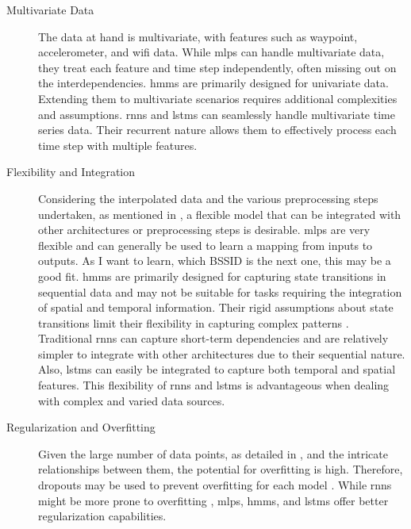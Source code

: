 \begin{description}
\item [Multivariate Data]
The data at hand is multivariate, with features such as waypoint, accelerometer, and \ac{wifi} data.
While \acp{mlp} can handle multivariate data, they treat each feature and time step independently, often missing out on the interdependencies.
\acp{hmm} are primarily designed for univariate data. Extending them to multivariate scenarios requires additional complexities and assumptions.
\acp{rnn} and \acp{lstm} can seamlessly handle multivariate time series data. 
Their recurrent nature allows them to effectively process each time step with multiple features.
\end{description}

\begin{description}
\item[Flexibility and Integration]
Considering the interpolated data and the various preprocessing steps undertaken, as mentioned in , a flexible model that can be integrated with other architectures or preprocessing steps is desirable. 
\acp{mlp} are very flexible and can generally be used to learn a mapping from inputs to outputs. \cite{mlp-vs-cnn-vs-rnn} 
As I want to learn, which BSSID is the next one, this may be a good fit.
\acp{hmm} are primarily designed for capturing state transitions in sequential data and may not be suitable for tasks requiring the integration of spatial and temporal information.
Their rigid assumptions about state transitions limit their flexibility in capturing complex patterns \cite{hmm-rabiner-1989}.
Traditional \acp{rnn} can capture short-term dependencies and are relatively simpler to integrate with other architectures due to their sequential nature.
Also, \acp{lstm} can easily be integrated to capture both temporal and spatial features. 
This flexibility of \acp{rnn} and \acp{lstm} is advantageous when dealing with complex and varied data sources.
\end{description}

\begin{description}
\item[Regularization and Overfitting]
Given the large number of data points, as detailed in , and the intricate relationships between them, the potential for overfitting is high.
Therefore, dropouts may be used to prevent overfitting for each model \cite{srivastava14a}.
While \acp{rnn} might be more prone to overfitting \cite{rnn_difficulties_2013}, \acp{mlp}, \acp{hmm}, and \acp{lstm} offer better regularization capabilities.
\end{description}

